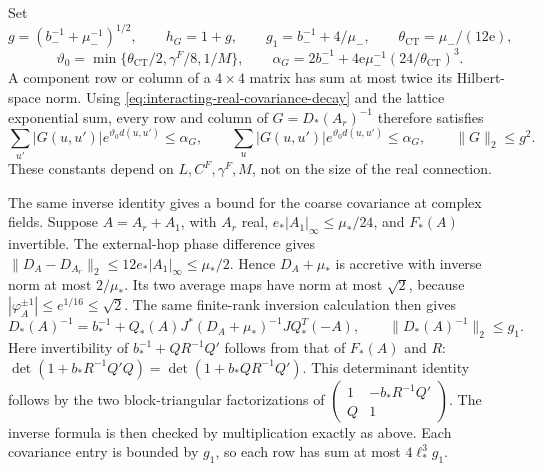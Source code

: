 Set
\[
 g=(b_-^{-1}+\mu_-^{-1})^{1/2},\qquad
 h_G=1+g,\qquad g_1=b_-^{-1}+4/\mu_-,
 \qquad \theta_{\mathrm{CT}}=\mu_-/(12\mathrm e),
\]
\[
 \vartheta_0=\min\{\theta_{\mathrm{CT}}/2,\gamma^F/8,1/M\},
 \qquad
 \alpha_G=2b_-^{-1}
        +4\mathrm e\mu_-^{-1}(24/\theta_{\mathrm{CT}})^3.
\]
A component row or column of a $4\times4$ matrix
has sum at most twice its Hilbert-space norm.
Using \eqref{eq:interacting-real-covariance-decay}
and the lattice exponential sum, every row and
column of $G=D_*(A_r)^{-1}$ therefore satisfies
\begin{equation}\label{eq:interacting-Gaussian-covariance}
 \sum_{u'}|G(u,u')|e^{\vartheta_0d(u,u')}
       \le\alpha_G,\qquad
 \sum_u|G(u,u')|e^{\vartheta_0d(u,u')}
       \le\alpha_G,\qquad \|G\|_2\le g^2.
\end{equation}
These constants depend on $L,C^F,\gamma^F,M$,
not on the size of the real connection.

The same inverse identity gives a bound for the
coarse covariance at complex fields. Suppose
$A=A_r+A_1$, with $A_r$ real,
$e_*|A_1|_\infty\le\mu_*/24$, and $F_*(A)$
invertible. The external-hop phase difference
gives $\|D_A-D_{A_r}\|_2\le12e_*|A_1|_\infty
\le\mu_*/2$. Hence $D_A+\mu_*$ is accretive
with inverse norm at most $2/\mu_*$. Its two
average maps have norm at most $\sqrt2$,
because $|\varphi_A^{\pm1}|\le e^{1/16}\le\sqrt2$.
The same finite-rank inversion calculation
then gives
\begin{equation}\label{eq:interacting-complex-covariance}
 D_*(A)^{-1}=b_*^{-1}+
 Q_*(A)J^*(D_A+\mu_*)^{-1}JQ_*^T(-A),
 \qquad
 \|D_*(A)^{-1}\|_2\le g_1.
\end{equation}
Here invertibility of $b_*^{-1}+QR^{-1}Q'$
follows from that of $F_*(A)$ and $R$:
$\det(1+b_*R^{-1}Q'Q)=\det(1+b_*QR^{-1}Q')$.
This determinant identity follows by the two
block-triangular factorizations of
$\left(\begin{smallmatrix}1&-b_*R^{-1}Q'\\Q&1\end{smallmatrix}\right)$.
The inverse formula is then checked by
multiplication exactly as above.
Each covariance entry is bounded by $g_1$,
so each row has sum at most $4\ell_*^3g_1$.


\printbibliography

